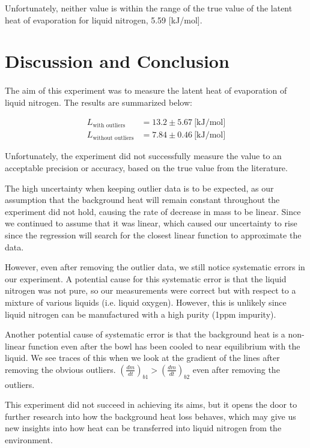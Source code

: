 \documentclass{article}
\begin{document}
Unfortunately, neither value is within the range of the true value of the latent heat of evaporation for liquid nitrogen, 5.59 [kJ/mol].


\section{Discussion and Conclusion}
\paragraph{}

The aim of this experiment was to measure the latent heat of evaporation of liquid nitrogen. The results are summarized below:

\begin{align*}
  L_{\text{with outliers}}    &= 13.2 \pm 5.67 ~ \text{[kJ/mol]} \\
  L_{\text{without outliers}} &= 7.84 \pm 0.46 ~ \text{[kJ/mol]}
\end{align*}

Unfortunately, the experiment did not successfully measure the value to an acceptable precision or accuracy, based on the true value from the literature.

The high uncertainty when keeping outlier data is to be expected, as our assumption that the background heat will remain constant throughout the experiment did not hold, causing the rate of decrease in mass to be linear. Since we continued to assume that it was linear, which caused our uncertainty to rise since the regression will search for the closest linear function to approximate the data.

However, even after removing the outlier data, we still notice systematic errors in our experiment. A potential cause for this systematic error is that the liquid nitrogen was not pure, so our measurements were correct but with respect to a mixture of various liquids (i.e. liquid oxygen). However, this is unlikely since liquid nitrogen can be manufactured with a high purity (1ppm impurity).

Another potential cause of systematic error is that the background heat is a non-linear function even after the bowl has been cooled to near equilibrium with the liquid. We see traces of this when we look at the gradient of the lines after removing the obvious outliers. $\left( \frac{dm}{dt} \right)_{b1} >   \left( \frac{dm}{dt} \right)_{b2}$ even after removing the outliers.

This experiment did not succeed in achieving its aims, but it opens the door to further research into how the background heat loss behaves, which may give us new insights into how heat can be transferred into liquid nitrogen from the environment.

\printbibliography
\end{document}
